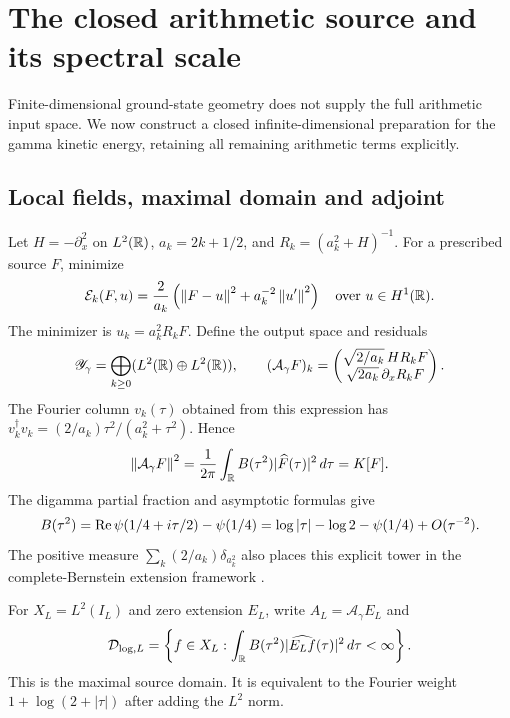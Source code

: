 \section{The closed arithmetic source and its spectral scale}
\label{sec:closed-source}
Finite-dimensional ground-state geometry does not supply the full
arithmetic input space. We now construct a closed infinite-dimensional
preparation for the gamma kinetic energy, retaining all remaining
arithmetic terms explicitly.

\subsection{Local fields, maximal domain and adjoint}
Let $H=-\partial_x^2$ on $L^2(\mathbb R)$, $a_k=2k+1/2$, and
$R_k=(a_k^2+H)^{-1}$. For a prescribed source $F$, minimize
\[
\mathcal E_k(F,u)=\frac2{a_k}
 \left(\left\lVert F-u\right\rVert^2+a_k^{-2}\left\lVert u'\right\rVert^2\right)
\quad\text{over }u\in H^1(\mathbb R).
\]
The minimizer is $u_k=a_k^2R_kF$. Define the output space and residuals
\begin{equation}\label{source:definition}
\mathscr Y_\gamma=\bigoplus_{k\ge0}(L^2(\mathbb R)\oplus L^2(\mathbb R)),
\qquad
(\mathcal A_\gamma F)_k=
\begin{pmatrix}
\sqrt{2/a_k}\,H R_kF\\
\sqrt{2a_k}\,\partial_xR_kF
\end{pmatrix}.
\end{equation}
The Fourier column $v_k(\tau)$ obtained from this expression has
$v_k^\dagger v_k=(2/a_k)\tau^2/(a_k^2+\tau^2)$. Hence
\[
\left\lVert\mathcal A_\gamma F\right\rVert^2
=\frac1{2\pi}\int_\mathbb R B(\tau^2)|\widehat F(\tau)|^2\,d\tau=K[F].
\]
The digamma partial fraction and asymptotic formulas \cite{DLMF} give
\begin{equation}\label{source:log}
B(\tau^2)=\operatorname{Re}\psi(1/4+i\tau/2)-\psi(1/4)
=\log|\tau|-\log2-\psi(1/4)+O(\tau^{-2}).
\end{equation}
The positive measure
$\sum_k(2/a_k)\delta_{a_k^2}$ also places this explicit tower in the
complete-Bernstein extension framework \cite{KwasnickiMucha}.

For $X_L=L^2(I_L)$ and zero extension $E_L$, write
$A_L=\mathcal A_\gamma E_L$ and
\begin{equation}\label{source:domain}
\mathcal D_{\log,L}=
\left\{f\in X_L:
 \int_\mathbb R B(\tau^2)|\widehat{E_Lf}(\tau)|^2\,d\tau<\infty\right\}.
\end{equation}
This is the maximal source domain. It is equivalent to the
Fourier weight $1+\log(2+|\tau|)$ after adding the $L^2$ norm.

